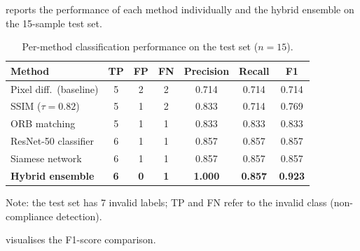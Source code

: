  reports the performance of each method individually and
the hybrid ensemble on the 15-sample test set.

\begin{table}[h]
\centering
\caption{Per-method classification performance on the test set ($n=15$).}
\label{tab:method_comparison}
\setlength{\tabcolsep}{6pt}
\begin{tabular}{lcccccc}
\toprule
\textbf{Method} & \textbf{TP} & \textbf{FP} & \textbf{FN} & \textbf{Precision} & \textbf{Recall} & \textbf{F1} \\
\midrule
Pixel diff.\ (baseline) & 5 & 2 & 2 & 0.714 & 0.714 & 0.714 \\
SSIM ($\tau=0.82$)      & 5 & 1 & 2 & 0.833 & 0.714 & 0.769 \\
ORB matching            & 5 & 1 & 1 & 0.833 & 0.833 & 0.833 \\
ResNet-50 classifier    & 6 & 1 & 1 & 0.857 & 0.857 & 0.857 \\
Siamese network         & 6 & 1 & 1 & 0.857 & 0.857 & 0.857 \\
\midrule
\textbf{Hybrid ensemble}& \textbf{6} & \textbf{0} & \textbf{1} & \textbf{1.000} & \textbf{0.857} & \textbf{0.923} \\
\bottomrule
\end{tabular}
\end{table}

\noindent Note: the test set has 7 invalid labels; TP and FN refer to the invalid class
(non-compliance detection).

 visualises the F1-score comparison.

